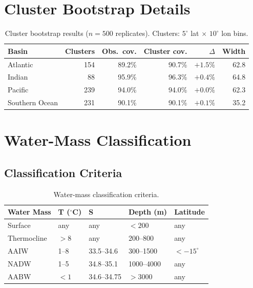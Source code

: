 \documentclass[12pt,a4paper]{article}
\begin{document}
\section{Cluster Bootstrap Details}

\begin{table}[htbp]
\centering
\caption{Cluster bootstrap results ($n = 500$ replicates). Clusters: $5^\circ$ lat $\times$ $10^\circ$ lon bins.}
\begin{tabular}{lrrrrr}
\toprule
\textbf{Basin} & \textbf{Clusters} & \textbf{Obs.\ cov.} & \textbf{Cluster cov.} & $\Delta$ & \textbf{Width} \\
\midrule
Atlantic        & 154 & 89.2\% & 90.7\% & $+1.5\%$ & 62.8 \\
Indian          &  88 & 95.9\% & 96.3\% & $+0.4\%$ & 64.8 \\
Pacific         & 239 & 94.0\% & 94.0\% & $+0.0\%$ & 62.3 \\
Southern Ocean  & 231 & 90.1\% & 90.1\% & $+0.1\%$ & 35.2 \\
\bottomrule
\end{tabular}
\end{table}

\section{Water-Mass Classification}

\subsection{Classification Criteria}

\begin{table}[htbp]
\centering
\caption{Water-mass classification criteria.}
\begin{tabular}{lllll}
\toprule
\textbf{Water Mass} & T ($^\circ$C) & S & Depth (m) & Latitude \\
\midrule
Surface     & any        & any        & $< 200$        & any \\
Thermocline & $> 8$      & any        & 200--800       & any \\
AAIW        & 1--8       & 33.5--34.6 & 300--1500      & $< -15^\circ$ \\
NADW        & 1--5       & 34.8--35.1 & 1000--4000     & any \\
AABW        & $< 1$      & 34.6--34.75 & $> 3000$      & any \\
\bottomrule
\end{tabular}
\end{table}
\end{document}
